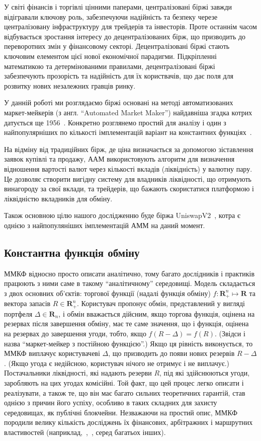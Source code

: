 \documentclass[../index.tex]{subfiles}
\begin{document}
У світі фінансів і торгівлі цінними паперами, централізовані біржі завжди
відігравали ключову роль, забезпечуючи надійність та безпеку черезе
централізовану інфраструктуру для трейдерів та інвесторів. Проте останнім часом
відбувається зростання інтересу до децентралізованих бірж, що призводить до
переворотних змін у фінансовому секторі. Децентралізовані біржі стають ключовим
елементом цієї нової економічної парадигми. Підкріпленні математикою та
детермінованими правилами, децентралізовані біржі забезпечують прозорість та
надійність для їх користвачів, що дає поля для розвитку нових незалежних гравців
ринку.

У данній роботі ми розглядаємо біржі основані на методі автоматизованих
маркет-мейкерів (з англ. ``Automated Market Maker'') найдавніша згадка котрих
датується ще 1956~\cite{mccarthy}. Конкретно розглянемо простий для аналізу і
один з найпопулярніших по кількості імплементацій варіант на константних
функціях~\cite{angeris_2023}.

На відміну від традиційних бірж, де ціна визначається за допомогою зіставлення
заявок купівлі та продажу, ААМ використовують алгоритм для визначення відношення
вартості валют через кількості вкладів (ліквідність) у валютну пару. Це дозволяє
створити вигідну систему для владників ліквідності, що отримують винагороду за
свої вклади, та трейдерів, що бажають скористатися платформою і ліквідністю
вкладників для обміну.

Також основною цілю нашого дослідженню буде біржа
UniswapV2~\cite{adams2021uniswap}, котра є однією з найпопуляніших імплементацій
АММ на даний момент.

\subsection*{Константна функція обміну}\label{sec:math-model}

ММКФ відносно просто описати аналітично, тому багато дослідників і практиків
працюють з ними саме в такому ``аналітичному'' середовищі. Модель складається з
двох основних об'єктів: торгової функції (надалі функція обміну)
$f : \mathbf{R}_{+}^{n} \mapsto \mathbf{R}$ та вектора запасів
$R \in \mathbf{R}^{n}_{+}$. Користувач пропонує обмін, представлений у вигляді
портфеля $\Delta \in \mathbf{R}_{n}$, і обмін вважається дійсним, якщо торгова
функція, оцінена на резервах після завершення обміну, має те саме значення, що і
функція, оцінена на резервах до завершення угоди, тобто, якщо
$f(R - \Delta) = f(R)$. (Звідси і назва ``маркет-мейкер з постійною функцією''.)
Якщо ця рівність виконується, то ММКФ виплачує користувачеві $\Delta$, що
призводить до появи нових резервів $R - \Delta$. (Якщо угода є недійсною,
користувач нічого не отримує і не виплачує.) Постачальники ліквідності, які
надають резерви $R$, під які здійснюються угоди, заробляють на цих угодах
комісійні. Той факт, що цей процес легко описати і реалізувати, а також те, що
він має багато сильних теоретичних гарантій, став однією з причин його успіху,
особливо в таких складних для захисту середовищах, як публічні блокчейни.
Незважаючи на простий опис, ММКФ породили велику кількість досліджень їх
фінансових, арбітражних і маршрутних властивостей
(наприклад,~\cite{Angeris_2020},~\cite{danos}, серед багатьох інших).
\end{document}
